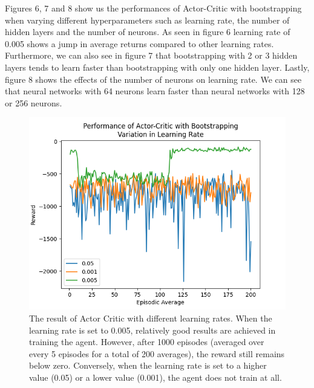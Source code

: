 \documentclass{article}
\begin{document}
Figures 6, 7 and 8 show us the performances of Actor-Critic with bootstrapping when varying different hyperparameters such as learning rate, the number of hidden layers and the number of neurons. \newline 
As seen in figure 6 learning rate of 0.005 shows a jump in average returns compared to other learning rates. Furthermore, we can also see in figure 7 that bootstrapping with 2 or 3 hidden layers tends to learn faster than bootstrapping with only one hidden layer. Lastly, figure 8 shows the effects of the number of neurons on learning rate. We can see that neural networks with 64 neurons learn faster than neural networks with 128 or 256 neurons. 
\begin{figure}[h!]
    \centering
\includegraphics[width=0.9\linewidth]{Report/images/06.Performance_of_Actor_Critic_BS_LR.png}
\caption{\label{fig:ActorCritic for different learning rates}The result of Actor Critic with different learning rates. When the learning rate is set to 0.005, relatively good results are achieved in training the agent. However, after 1000 episodes (averaged over every 5 episodes for a total of 200 averages), the reward still remains below zero. Conversely, when the learning rate is set to a higher value (0.05) or a lower value (0.001), the agent does not train at all.}
\end{figure}
\end{document}
